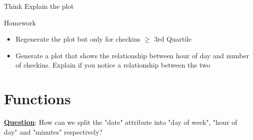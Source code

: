 \documentclass[12pt]{book}\usepackage{knitr}
\begin{document}
\begin{DIY}{Think}
\noindent Explain the plot
\end{DIY}

\begin{DIY}{Homework}
\begin{itemize}
  \item \noindent Regenerate the plot but only for checkins $\geq$ 3rd Quartile
  \item \noindent Generate a plot that shows the relationship between hour of day and number of checkins. Explain if you notice a relationship between the two
\end{itemize}
\end{DIY}


\newpage
\section{Functions}
\label{sec:functions}
\begin{HIGHLIGHT}
\par{}
\end{HIGHLIGHT}
\noindent \textbf{\underline{Question}}: How can we split the "date" attribute into "day of week", "hour of day" and "minutes" respectively?
\end{document}
